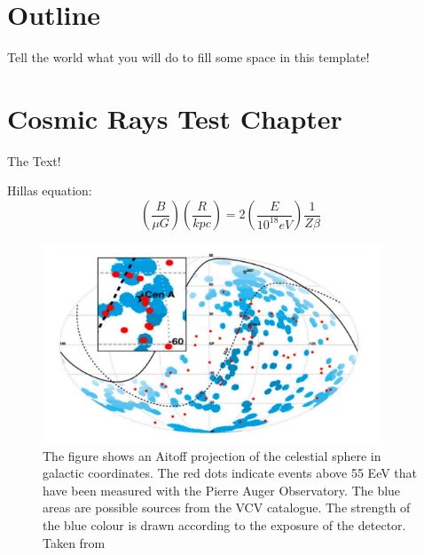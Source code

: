 \chapter*{Outline}

Tell the world what you will do to fill some space in this template!

\setcounter{chapter}{0}
\chapter{Cosmic Rays Test Chapter}
\label{chapter:Approach}
The Text!

Hillas equation: \cite{Hillas}
\begin{equation}
 \left(\frac{B}{\mu G}\right)\left(\frac {R}{kpc}\right) = 2\left(\frac{E}{10^{18}eV}\right)\frac1{Z\beta}
\label{eq:Hillas}
\end{equation}

\begin{figure}
  \centering
  \includegraphics[width=0.9\textwidth]{bilder/AugerAGNplotICRC2009.png}
  \caption[Distribution of events of the highest energies of the Pierre Auger Observatory]{The figure shows an Aitoff projection of the celestial sphere in galactic coordinates. The red dots indicate events above 55 EeV that have been measured with the Pierre Auger Observatory. The blue areas are possible sources from the VCV catalogue. The strength of the blue colour is drawn according to the exposure of the detector. Taken from \cite{Hague2009} }
  \label{fig:AGN}
\end{figure}



